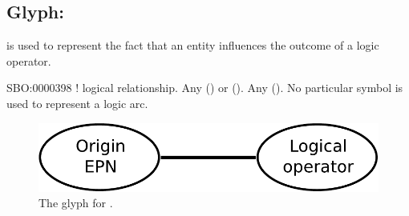 \subsection{Glyph:  }\label{sec:logicArc}

 is used to represent the fact that an entity influences
the outcome of a logic operator. 

\begin{glyphDescription}
 \glyphSboTerm SBO:0000398 ! logical relationship.
 \glyphOrigin Any  () or  ().
 \glyphTarget Any  ().
 \glyphEndPoint No particular symbol is used to represent a logic arc.
 \end{glyphDescription}

\begin{figure}[H]
  \centering
  \includegraphics[scale = 0.4]{images/logicArc}
  \caption{The \PD glyph for .}
  \label{fig:logicArc}
\end{figure}
